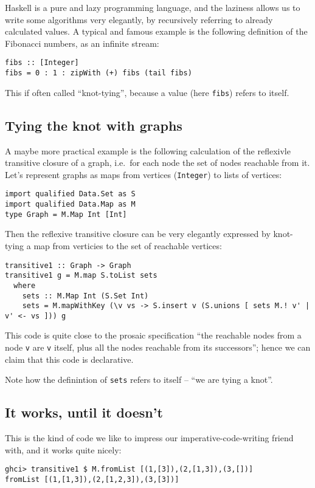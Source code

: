 \documentclass[manuscript,screen,acmsmall]{acmart}
\begin{document}
Haskell is a pure and lazy programming language, and the laziness allows us to write some algorithms very elegantly, by recursively referring to already calculated values. A typical and famous example is the following definition of the Fibonacci numbers, as an infinite stream:
\begin{verbatim}
fibs :: [Integer]
fibs = 0 : 1 : zipWith (+) fibs (tail fibs)
\end{verbatim}
This if often called “knot-tying”, because a value (here \verb|fibs|) refers to itself.

\subsection{Tying the knot with graphs}

A maybe more practical example is the following calculation of the reflexivle transitive closure of a graph, i.e.\ for each node the set of nodes reachable from it. Let's represent graphs as maps from vertices (\verb|Integer|) to lists of vertices:
\begin{verbatim}
import qualified Data.Set as S
import qualified Data.Map as M
type Graph = M.Map Int [Int]
\end{verbatim}

Then the reflexive transitive closure can be very elegantly expressed by knot-tying a map from verticies to the set of reachable vertices:
\begin{verbatim}
transitive1 :: Graph -> Graph
transitive1 g = M.map S.toList sets
  where
    sets :: M.Map Int (S.Set Int)
    sets = M.mapWithKey (\v vs -> S.insert v (S.unions [ sets M.! v' | v' <- vs ])) g
\end{verbatim}
This code is quite close to the prosaic specification “the reachable nodes from a node \verb|v| are \verb|v| itself, plus all the nodes reachable from its successors”; hence we can claim that this code is declarative.

Note how the definintion of \verb|sets| refers to itself -- “we are tying a knot”.

\subsection{It works, until it doesn't}

This is the kind of code we like to impress our imperative-code-writing friend with, and it works quite nicely:
\begin{verbatim}
ghci> transitive1 $ M.fromList [(1,[3]),(2,[1,3]),(3,[])]
fromList [(1,[1,3]),(2,[1,2,3]),(3,[3])]
\end{verbatim}
\end{document}
